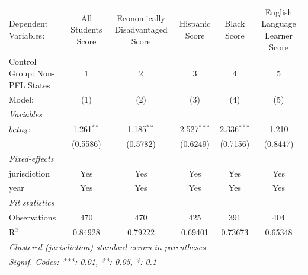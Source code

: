 
\begingroup
\centering
\begin{tabular}{lccccc}
   \tabularnewline \midrule \midrule
   Dependent Variables:          & All Students Score & Economically Disadvantaged Score & Hispanic Score & Black Score   & English Language Learner Score\\  
   Control Group: Non-PFL States & 1                  & 2                                & 3              & 4             & 5 \\   
   Model:                        & (1)                & (2)                              & (3)            & (4)           & (5)\\  
   \midrule
   \emph{Variables}\\
   $\\beta_3$:                   & 1.261$^{**}$       & 1.185$^{**}$                     & 2.527$^{***}$  & 2.336$^{***}$ & 1.210\\   
                                 & (0.5586)           & (0.5782)                         & (0.6249)       & (0.7156)      & (0.8447)\\   
   \midrule
   \emph{Fixed-effects}\\
   jurisdiction                  & Yes                & Yes                              & Yes            & Yes           & Yes\\  
   year                          & Yes                & Yes                              & Yes            & Yes           & Yes\\  
   \midrule
   \emph{Fit statistics}\\
   Observations                  & 470                & 470                              & 425            & 391           & 404\\  
   R$^2$                         & 0.84928            & 0.79222                          & 0.69401        & 0.73673       & 0.65348\\  
   \midrule \midrule
   \multicolumn{6}{l}{\emph{Clustered (jurisdiction) standard-errors in parentheses}}\\
   \multicolumn{6}{l}{\emph{Signif. Codes: ***: 0.01, **: 0.05, *: 0.1}}\\
\end{tabular}
\par\endgroup


